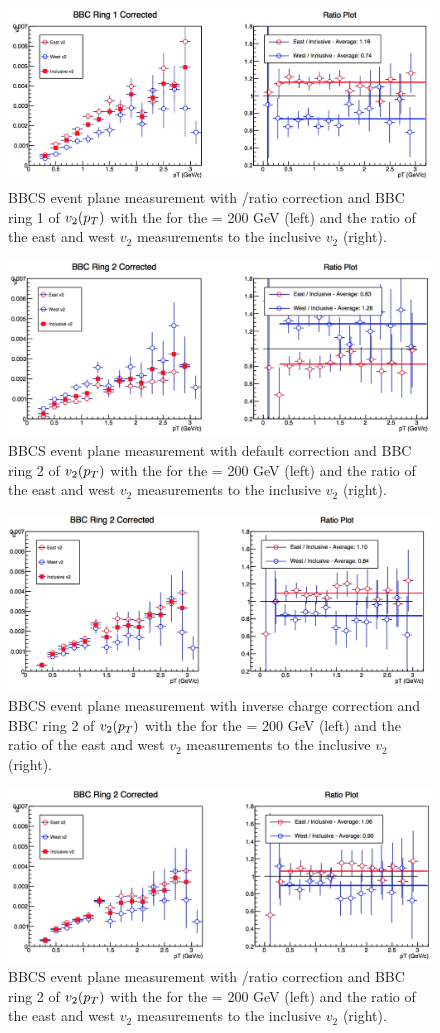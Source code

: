 \begin{figure}[!ht]
\centering
\includegraphics[width=0.65\linewidth]{figs/bbc_1_pp.png}
\caption{BBCS event plane measurement with \pp/\pau ratio correction and BBC ring 1 of $v_{2}(\mbox{$p_T$})$ with the  for the \pau \sqsn = 200 GeV (left) and the ratio of the east and west $v_2$ measurements to the inclusive $v_2$ (right).}
\end{figure}

\begin{figure}[!ht]
\centering
\includegraphics[width=0.65\linewidth]{figs/bbc_2_default.png}
\caption{BBCS event plane measurement with default correction and BBC ring 2 of $v_{2}(\mbox{$p_T$})$ with the  for the \pau \sqsn = 200 GeV (left) and the ratio of the east and west $v_2$ measurements to the inclusive $v_2$ (right).}
\end{figure}

\begin{figure}[!ht]
\centering
\includegraphics[width=0.65\linewidth]{figs/bbc_2_data.png}
\caption{BBCS event plane measurement with inverse charge correction and BBC ring 2 of $v_{2}(\mbox{$p_T$})$ with the  for the \pau \sqsn = 200 GeV (left) and the ratio of the east and west $v_2$ measurements to the inclusive $v_2$ (right).}
\end{figure}

\begin{figure}[!ht]
\centering
\includegraphics[width=0.65\linewidth]{figs/bbc_2_pp.png}
\caption{BBCS event plane measurement with \pp/\pau ratio correction and BBC ring 2 of $v_{2}(\mbox{$p_T$})$ with the  for the \pau \sqsn = 200 GeV (left) and the ratio of the east and west $v_2$ measurements to the inclusive $v_2$ (right).}
\end{figure}

